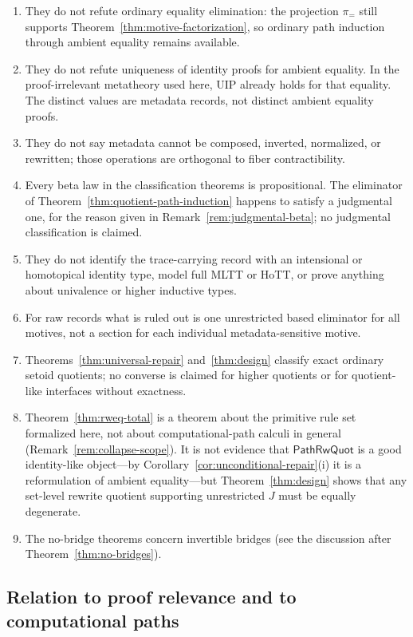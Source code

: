 \documentclass[10pt,reqno]{amsart}
\newcommand{\proj}{\pi_{=}}
\newcommand{\PRW}{\mathsf{PathRwQuot}}
\begin{document}
\begin{enumerate}[label=(\roman*)]
\item They do not refute ordinary equality elimination: the projection
  \(\proj\) still supports Theorem~\ref{thm:motive-factorization}, so ordinary
  path induction through ambient equality remains available.
\item They do not refute uniqueness of identity proofs for ambient equality.
  In the proof-irrelevant metatheory used here, UIP already holds for that
  equality.  The distinct values are metadata records, not distinct ambient
  equality proofs.
\item They do not say metadata cannot be composed, inverted, normalized, or
  rewritten; those operations are orthogonal to fiber contractibility.
\item Every beta law in the classification theorems is propositional.  The
  eliminator of Theorem~\ref{thm:quotient-path-induction} happens to satisfy a
  judgmental one, for the reason given in Remark~\ref{rem:judgmental-beta}; no
  judgmental classification is claimed.
\item They do not identify the trace-carrying record with an intensional or
  homotopical identity type, model full MLTT or HoTT, or prove anything about
  univalence or higher inductive types.
\item For raw records what is ruled out is one unrestricted based eliminator for
  all motives, not a section for each individual metadata-sensitive motive.
\item Theorems~\ref{thm:universal-repair} and~\ref{thm:design} classify exact
  ordinary setoid quotients; no converse is claimed for higher quotients or for
  quotient-like interfaces without exactness.
\item Theorem~\ref{thm:rweq-total} is a theorem about the primitive rule set
  formalized here, not about computational-path calculi in general
  (Remark~\ref{rem:collapse-scope}).  It is not evidence that \(\PRW\) is a good
  identity-like object---by Corollary~\ref{cor:unconditional-repair}(i) it is a
  reformulation of ambient equality---but Theorem~\ref{thm:design} shows that
  any set-level rewrite quotient supporting unrestricted \(J\) must be equally
  degenerate.
\item The no-bridge theorems concern invertible bridges (see the discussion
  after Theorem~\ref{thm:no-bridges}).
\end{enumerate}

\subsection{Relation to proof relevance and to computational paths}
\end{document}
